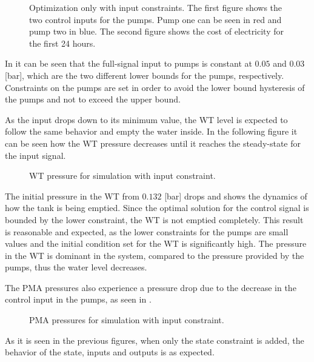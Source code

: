 \begin{figure}[H]
\centering
 
\caption{Optimization only with input constraints. The first figure shows the two control inputs for the pumps. Pump one can be seen in red and pump two in blue. The second figure shows the cost of electricity for the first 24 hours.}
\label{fig:Implementation_shit}
\end{figure}

In  it can be seen that the full-signal input to pumps is constant at $0.05$ and $0.03$ [bar], which are the two different lower bounds for the pumps, respectively. Constraints on the pumps are set in order to avoid the lower bound hysteresis of the pumps and not to exceed the upper bound. 

As the input drops down to its minimum value, the WT level is expected to follow the same behavior and empty the water inside. In the following figure it can be seen how the WT pressure decreases until it reaches the steady-state for the input signal.

\begin{figure}[H]
\centering
 
\caption{WT pressure for simulation with input constraint.}
\label{fig:WT_input}
\end{figure}

The initial pressure in the WT from $0.132$ [bar] drops and shows the dynamics of how the tank is being emptied. Since the optimal solution for the control signal is bounded by the lower constraint, the WT is not emptied completely. This result is reasonable and expected, as the lower constraints for the pumps are small values and the initial condition set for the WT is significantly high. The pressure in the WT is dominant in the system, compared to the pressure provided by the pumps, thus the water level decreases.

The PMA pressures also experience a pressure drop due to the decrease in the control input in the pumps, as seen in .

\begin{figure}[H]
\centering
 
\caption{PMA pressures for simulation with input constraint.}
\label{fig:Output_input}
\end{figure}

As it is seen in the previous figures, when only the state constraint is added, the behavior of the state, inputs and outputs is as expected. 

